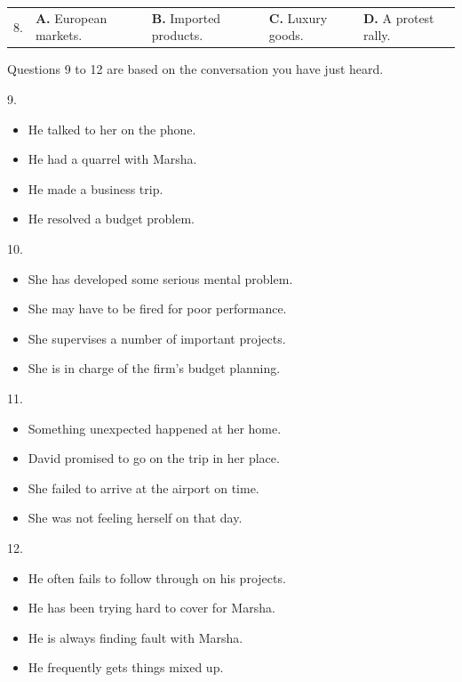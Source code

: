 \documentclass[UTF8,11pt]{ctexart}
\begin{document}
\noindent\begin{tabularx}{\linewidth}{@{}lXXXX@{}}8. & \textbf{A.} European markets. & \textbf{B.} Imported products. & \textbf{C.} Luxury goods. & \textbf{D.} A protest rally.\\\end{tabularx}\par

Questions 9 to 12 are based on the conversation you have just heard.


9.


\begin{itemize}[leftmargin=2em,itemsep=.2em,topsep=.4em]\item[A.] He talked to her on the phone.
\item[B.] He had a quarrel with Marsha.
\item[C.] He made a business trip.
\item[D.] He resolved a budget problem.
\end{itemize}

10.


\begin{itemize}[leftmargin=2em,itemsep=.2em,topsep=.4em]\item[A.] She has developed some serious mental problem.
\item[B.] She may have to be fired for poor performance.
\item[C.] She supervises a number of important projects.
\item[D.] She is in charge of the firm’s budget planning.
\end{itemize}

11.


\begin{itemize}[leftmargin=2em,itemsep=.2em,topsep=.4em]\item[A.] Something unexpected happened at her home.
\item[B.] David promised to go on the trip in her place.
\item[C.] She failed to arrive at the airport on time.
\item[D.] She was not feeling herself on that day.
\end{itemize}

12.


\begin{itemize}[leftmargin=2em,itemsep=.2em,topsep=.4em]\item[A.] He often fails to follow through on his projects.
\item[B.] He has been trying hard to cover for Marsha.
\item[C.] He is always finding fault with Marsha.
\item[D.] He frequently gets things mixed up.
\end{itemize}
\end{document}
